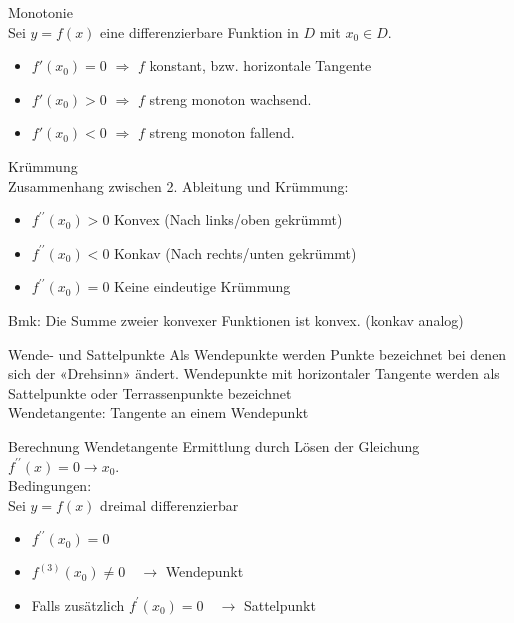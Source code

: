 \begin{definition}[breakable]{Monotonie}\\
    Sei $y=f(x)$ eine differenzierbare Funktion in $D$ mit $x_{0} \in D$.
    \begin{itemize}
        \item $f'( x_{0}) = 0$ $ \Rightarrow$   $f$ konstant, bzw. horizontale Tangente
        \item $f'( x_{0}) > 0 $ $ \Rightarrow$  $f$  streng monoton wachsend.
        \item $f'( x_{0}) < 0 $ $ \Rightarrow$ $f$ streng monoton fallend.
    \end{itemize}
\end{definition}
\begin{theorem}{Krümmung}\\
    Zusammenhang zwischen 2. Ableitung und Krümmung:
    \begin{itemize}
      \item $f^{\prime \prime}\left(x_{0}\right)>0$ Konvex (Nach links/oben gekrümmt)
      \item $f^{\prime \prime}\left(x_{0}\right)<0$ Konkav (Nach rechts/unten gekrümmt)
      \item $f^{\prime \prime}\left(x_{0}\right)=0$ Keine eindeutige Krümmung
    \end{itemize}
    Bmk: Die Summe zweier konvexer Funktionen ist konvex. (konkav analog)
\end{theorem}

\begin{definition}{Wende- und Sattelpunkte}
    Als Wendepunkte werden Punkte bezeichnet bei denen sich der «Drehsinn» ändert. Wendepunkte mit horizontaler Tangente werden als Sattelpunkte oder Terrassenpunkte bezeichnet\\

Wendetangente: Tangente an einem Wendepunkt
\end{definition}



\begin{KR}{Berechnung Wendetangente}
    Ermittlung durch Lösen der Gleichung $f^{\prime \prime}(x)=0 \rightarrow x_{0}$.\\
    Bedingungen:\\
    Sei $y=f(x)$ dreimal differenzierbar

\begin{itemize}
  \item $f^{\prime \prime}\left(x_{0}\right)=0$
  \item $f^{(3)}\left(x_{0}\right) \neq 0 \quad \rightarrow$ Wendepunkt
  \item Falls zusätzlich $f^{\prime}\left(x_{0}\right)=0 \quad \rightarrow$ Sattelpunkt
\end{itemize}
    
\end{KR}

